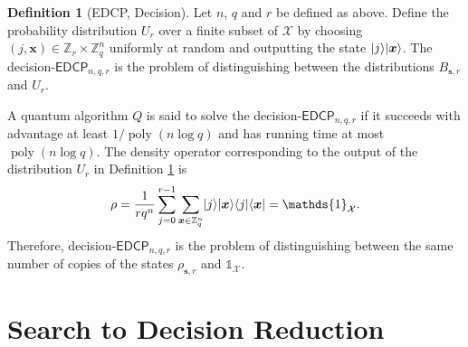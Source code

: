 \documentclass[11pt]{article}
\theoremstyle{plain}
\theoremstyle{definition}
\newtheorem{definition}[theorem]{Definition}
\DeclareMathOperator{\poly}{poly}
\DeclarePairedDelimiter{\ldbrac}{\lvert}{\rangle}
\DeclarePairedDelimiter{\rdbrac}{\langle}{\rvert}
\def\Z{\ensuremath{\mathbb{Z}}}
\def\edcp{\ensuremath{\mathsf{EDCP}}}
\begin{document}
\begin{definition}[EDCP, Decision]
    \label{def:d-edcp}
    Let $n$, $q$ and $r$ be defined as above. Define the probability distribution $U_{r}$ over a finite subset of $\mathcal{X}$ by choosing $(j, \bm{x}) \in \Z_r \times \Z_q^n$ uniformly at random and outputting the state $\ldbrac{j}\ldbrac{\bm{x}}$. The decision-$\edcp_{n, q, r}$ is the problem of distinguishing between the distributions $B_{\bm{s}, r}$ and $U_r$.
\end{definition}
A quantum algorithm $Q$ is said to solve the decision-$\edcp_{n, q, r}$ if it succeeds with advantage at least $1 / \poly(n\log q)$ and has running time at most $\poly(n\log q)$. The density operator corresponding to the output of the distribution $U_r$ in Definition \ref{def:d-edcp} is
\[ \rho = \frac{1}{rq^n} \sum_{j = 0}^{r - 1} \sum_{\bm{x} \in \Z_q^n}  \ldbrac{j}\ldbrac{\bm{x}} \rdbrac{j}\rdbrac{\bm{x}} = \mathds{1}_{\mathcal{X}}. \]
Therefore, decision-$\edcp_{n, q, r}$ is the problem of distinguishing between the same number of copies of the states $\rho_{\bm{s}, r}$ and $\mathds{1}_{\mathcal{X}}$. 





\section{Search to Decision Reduction}
\end{document}
